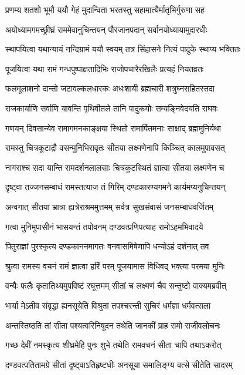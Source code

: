 \twolineshloka
{प्रणम्य शतशो भूमौ ययौ गेहं मुदान्विता}
{भरतस्तु सहामात्यैर्मातृभिर्गुरुणा सह} %

\twolineshloka
{अयोध्यामगमच्छ्रीघ्रं राममेवानुचिन्तयन्}
{पौरजानपदान् सर्वानयोध्यायामुदारधीः} %

\twolineshloka
{स्थापयित्वा यथान्यायं नन्दिग्रामं ययौ स्वयम्}
{तत्र सिंहासने नित्यं पादुके स्थाप्य भक्तितः} %

\twolineshloka
{पूजयित्वा यथा रामं गन्धपुष्पाक्षतादिभिः}
{राजोपचारैरखिलैः प्रत्यहं नियतव्रतः} %

\twolineshloka
{फलमूलाशनो दान्तो जटावल्कलधारकः}
{अधःशायी ब्रह्मचारी शत्रुघ्नसहितस्तदा} %

\twolineshloka
{राजकार्याणि सर्वाणि यावन्ति पृथिवीतले}
{तानि पादुकयोः सम्यङ्निवेदयति राघवः} %

\twolineshloka
{गणयन् दिवसान्येव रामागमनकाङ्क्षया}
{स्थितो रामार्पितमनाः साक्षाद् ब्रह्ममुनिर्यथा} %

\twolineshloka
{रामस्तु चित्रकूटाद्रौ वसन्मुनिभिरावृतः}
{सीतया लक्ष्मणेनापि किञ्चित् कालमुपावसत्} %

\twolineshloka
{नागराश्च सदा यान्ति रामदर्शनलालसाः}
{चित्रकूटस्थितं ज्ञात्वा सीतया लक्ष्मणेन च} %

\twolineshloka
{दृष्ट्वा तज्जनसम्बाधं रामस्तत्याज तं गिरिम्}
{दण्डकारण्यगमने कार्यमप्यनुचिन्तयन्} %

\twolineshloka
{अन्वगात् सीतया भ्रात्रा ह्यत्रेराश्रममुत्तमम्}
{सर्वत्र सुखसंवासं जनसम्बाधवर्जितम्} %

\twolineshloka
{गत्वा मुनिमुपासीनं भासयन्तं तपोवनम्}
{दण्डवत्प्रणिपत्याह रामोऽहमभिवादये} %

\twolineshloka
{पितुराज्ञां पुरस्कृत्य दण्डकाननमागतः}
{वनवासमिषेणापि धन्योऽहं दर्शनात् तव} %

\twolineshloka
{श्रुत्वा रामस्य वचनं रामं ज्ञात्वा हरिं परम्}
{पूजयामास विधिवद् भक्त्या परमया मुनिः} %

\twolineshloka
{वन्यैः फलैः कृतातिथ्यमुपविष्टं रघूत्तमम्}
{सीतां च लक्ष्मणं चैव सन्तुष्टो वाक्यमब्रवीत्} %

\twolineshloka
{भार्या मेऽतीव संवृद्धा ह्यनसूयेति विश्रुता}
{तपश्चरन्ती सुचिरं धर्मज्ञा धर्मवत्सला} %

\twolineshloka
{अन्तस्तिष्ठति तां सीता पश्यत्वरिनिषूदन}
{तथेति जानकीं प्राह रामो राजीवलोचनः} %

\twolineshloka
{गच्छ देवीं नमस्कृत्य शीघ्रमेहि पुनः शुभे}
{तथेति रामवचनं सीता चापि तथाऽकरोत्} %

\twolineshloka
{दण्डवत्पतितामग्रे सीतां दृष्ट्वाऽतिहृष्टधीः}
{अनसूया समालिङ्ग्य वत्से सीतेति सादरम्} %

